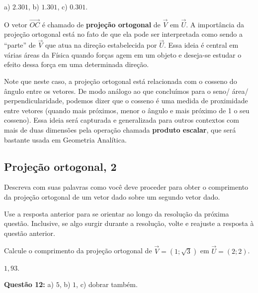 \documentclass[main.tex]{subfiles}
\begin{document}
\begin{gabarito}
	\begin{gabaritoQuestao}
		a) $2.301$, b) $1.301$, c) $0.301$.
	\end{gabaritoQuestao}
\end{gabarito}

O vetor $\overrightarrow{OC}$ é chamado de \textbf{projeção ortogonal} de $\overrightarrow{V}$ em $\overrightarrow{U}$. A importância da projeção ortogonal está no fato de que ela pode ser interpretada como sendo a ``parte'' de $\overrightarrow{V}$ que atua na direção estabelecida por $\overrightarrow{U}$. Essa ideia é central em várias áreas da Física quando forças agem em um objeto e deseja-se estudar o efeito dessa força em uma determinada direção.

Note que neste caso, a projeção ortogonal está relacionada com o cosseno do ângulo entre os vetores. De modo análogo ao que concluímos para o seno/ área/ perpendicularidade, podemos dizer que o cosseno é uma medida de proximidade entre vetores (quando mais próximos, menor o ângulo e mais próximo de 1 o seu cosseno). Essa ideia será capturada e generalizada para outros contextos com mais de duas dimensões pela operação chamada \textbf{produto escalar}, que será bastante usada em Geometria Analítica.


\subsection*{Projeção ortogonal, 2}

\begin{reflita}
 Descreva com suas palavras como você deve proceder para obter o comprimento da projeção ortogonal de um vetor dado sobre um segundo vetor dado.
\end{reflita}

Use a resposta anterior para se orientar ao longo da resolução da próxima questão. Inclusive, se algo surgir durante a resolução, volte e reajuste a resposta à questão anterior.

\begin{questao}
\item Calcule o comprimento da projeção ortogonal de $\overrightarrow{V}=(1;\sqrt{3})$ em $\overrightarrow{U}=(2;2)$.
\end{questao}

\begin{gabarito}
	\begin{gabaritoQuestao}
		$1,93$.

\noindent\textbf{Questão 12:} a) $5$, b) $1$, c) dobrar também.
	\end{gabaritoQuestao}
\end{gabarito}
\end{document}
